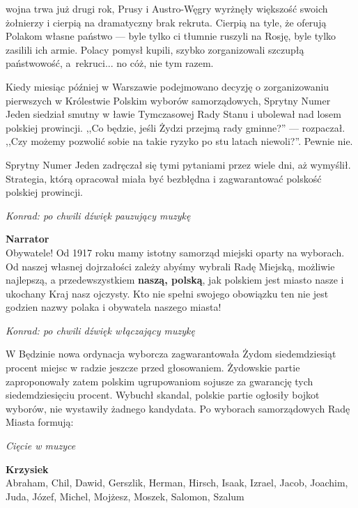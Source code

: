 \documentclass[11pt,a4paper,oneside]{article}
\begin{document}
wojna trwa już drugi rok, Prusy i Austro-Węgry wyrżnęły większość
swoich żołnierzy i cierpią na dramatyczny brak rekruta. Cierpią na
tyle, że oferują Polakom własne państwo --- byle tylko ci tłumnie
ruszyli na Rosję, byle tylko zasilili ich armie. Polacy pomysł kupili,
szybko zorganizowali szczupłą państwowość, a~rekruci... no cóż, nie
tym razem.

Kiedy miesiąc później w Warszawie podejmowano decyzję o zorganizowaniu
pierwszych w Królestwie Polskim wyborów samorządowych, Sprytny Numer
Jeden siedział smutny w ławie Tymczasowej Rady Stanu i ubolewał nad
losem polskiej prowincji. ,,Co będzie, jeśli Żydzi przejmą rady
gminne?'' --- rozpaczał.  ,,Czy możemy pozwolić sobie na takie ryzyko
po stu latach niewoli?''. Pewnie nie.

Sprytny Numer Jeden zadręczał się tymi pytaniami przez wiele dni, aż
wymyślił.  Strategia, którą opracował miała być bezbłędna
i zagwarantować polskość polskiej prowincji. 

{\color{konrad} \emph{Konrad: po chwili dźwięk pauzujący muzykę}}

\textbf{Narrator}\\
Obywatele! Od 1917 roku mamy istotny samorząd miejski oparty na
wyborach. Od naszej własnej dojrzałości zależy abyśmy wybrali Radę
Miejską, możliwie najlepszą, a przedewszystkiem \textbf{naszą,
polską}, jak polskiem jest miasto nasze i ukochany Kraj nasz ojczysty.
Kto nie spełni swojego obowiązku ten nie jest godzien nazwy polaka
i obywatela naszego miasta!

{\color{konrad} \emph{Konrad: po chwili dźwięk włączający muzykę}}

W Będzinie nowa ordynacja wyborcza zagwarantowała Żydom siedemdziesiąt
procent miejsc w radzie jeszcze przed głosowaniem. Żydowskie partie %
zaproponowały zatem polskim ugrupowaniom sojusze za gwarancję tych
siedemdziesięciu procent. Wybuchł skandal, polskie partie ogłosiły
bojkot wyborów, nie wystawiły żadnego kandydata. Po wyborach 
samorządowych Radę Miasta formują:

{\color{light-gray} \emph{Cięcie w muzyce}}

{\color{krzysiek}
\textbf{Krzysiek}\\
Abraham, Chil, Dawid, Gerszlik, Herman, Hirsch, Isaak, Izrael, Jacob,
Joachim, Juda, Józef, Michel, Mojżesz, Moszek, Salomon, Szalum
}
\end{document}
